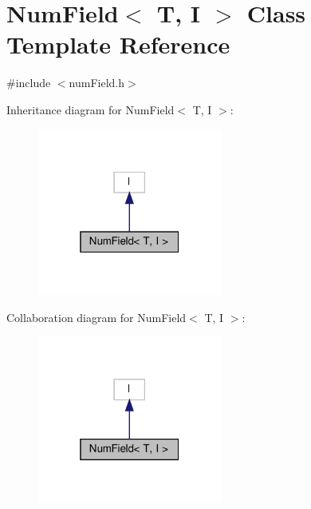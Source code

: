 \hypertarget{classNumField}{}\section{Num\+Field$<$ T, I $>$ Class Template Reference}
\label{classNumField}


{\ttfamily \#include $<$num\+Field.\+h$>$}



Inheritance diagram for Num\+Field$<$ T, I $>$\+:\nopagebreak
\begin{figure}[H]
\begin{center}
\leavevmode
\includegraphics[width=172pt]{classNumField__inherit__graph}
\end{center}
\end{figure}


Collaboration diagram for Num\+Field$<$ T, I $>$\+:\nopagebreak
\begin{figure}[H]
\begin{center}
\leavevmode
\includegraphics[width=172pt]{classNumField__coll__graph}
\end{center}
\end{figure}
